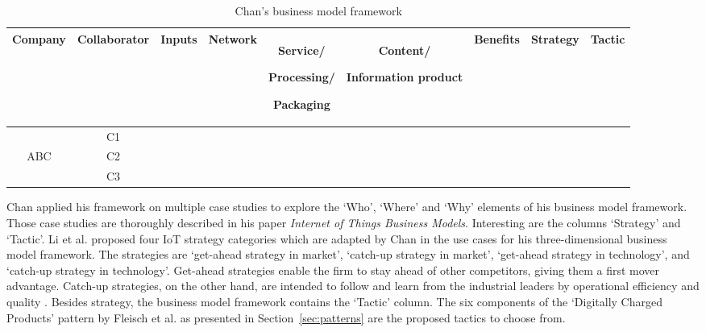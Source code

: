 		\begin{table}[h!]
			\scriptsize
			\centering			
			\caption{Chan's business model framework \cite{chan}}
			\label{tab:chan}
			\centering
			\vspace{0.2cm}
			\renewcommand{\arraystretch}{1.5}

			\begin{tabular}{| c | c | c | c | c | c | c | c | c |}

				\hline
				\rule{0pt}{8pt}
				Company & Collaborator & Inputs & Network & \parbox[m]{0.6in}{\centering\strut Service/ \par Processing/ \par Packaging \strut} & \parbox[m]{0.6in}{\centering\strut Content/ \par Information product \strut} & Benefits & Strategy & Tactic\\
				\hline
				        & C1           &        &         &                                                          &                                                   &          &          &       \\
				ABC     & C2           &        &         &                                                          &                                                   &          &          &       \\
				        & C3           &        &         &                                                          &                                                   &          &          &       \\
				\hline
			\end{tabular}
		\end{table}

		Chan applied his framework on multiple case studies to explore the `Who', `Where' and `Why' elements of his business model framework. Those case studies are thoroughly described in his paper \emph{Internet of Things Business Models}\cite{chan}. Interesting are the columns `Strategy' and `Tactic'. Li et al. \cite{li} proposed four IoT strategy categories which are adapted by Chan in the use cases for his three-dimensional business model framework. The strategies are `get-ahead strategy in market', `catch-up strategy in market', `get-ahead strategy in technology', and `catch-up strategy in technology'. Get-ahead strategies enable the firm to stay ahead of other competitors, giving them a first mover advantage. Catch-up strategies, on the other hand, are intended to follow and learn from the industrial leaders by operational efficiency and quality \cite{chan}.
		Besides strategy, the business model framework contains the `Tactic' column. The six components of the `Digitally Charged Products' pattern by Fleisch et al. \cite{fleisch} as presented in Section~\ref{sec:patterns} are the proposed tactics to choose from.
%
